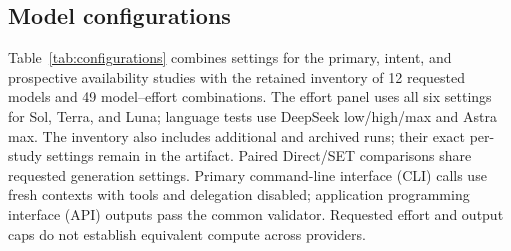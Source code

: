\documentclass[11pt]{article}
\begin{document}
\subsection{Model configurations}
\label{app:model-configurations}
\label{app:qwen}
\label{app:primary-extensions}
Table~\ref{tab:configurations} combines settings for the primary, intent, and prospective availability studies with the retained inventory of 12 requested models and 49 model--effort combinations. The effort panel uses all six settings for Sol, Terra, and Luna; language tests use DeepSeek low/high/max and Astra max. The inventory also includes additional and archived runs; their exact per-study settings remain in the artifact. Paired Direct/SET comparisons share requested generation settings. Primary command-line interface (CLI) calls use fresh contexts with tools and delegation disabled; application programming interface (API) outputs pass the common validator. Requested effort and output caps do not establish equivalent compute across providers.
\end{document}
